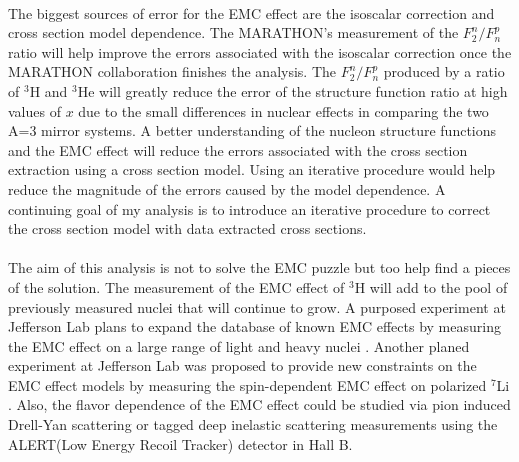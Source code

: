 \paragraph{}The biggest sources of error for the EMC effect are the isoscalar correction and cross section model dependence. The MARATHON's measurement of the $F^n_2/F^p_n$ ratio will help improve the errors associated with the isoscalar correction once the MARATHON collaboration finishes the analysis. The $F^n_2/F^p_n$ produced by a ratio of $^3$H and $^3$He will greatly reduce the error of the structure function ratio at high values of $x$ due to the small differences in nuclear effects in comparing the two A=3 mirror systems. A better understanding of the nucleon structure functions and the EMC effect will reduce the errors associated with the cross section extraction using a cross section model. Using an iterative procedure would help reduce the magnitude of the errors caused by the model dependence. A continuing goal of my analysis is to introduce an iterative procedure to correct the cross section model with data extracted cross sections. 

\paragraph{}The aim of this analysis is not to solve the EMC puzzle but too help find a pieces of the solution. The measurement of the EMC effect of $^3$H will add to the pool of previously measured nuclei that will continue to grow. A purposed experiment at Jefferson Lab plans to expand the database of known EMC effects by measuring the EMC effect on a large range of light and heavy nuclei \cite{pro_gaskell}. Another planed experiment at Jefferson Lab was proposed to provide new constraints on the EMC effect models by measuring the spin-dependent EMC effect on polarized $^7$Li \cite{pro_brooks}. Also, the flavor dependence of the EMC effect could be studied via pion induced Drell-Yan scattering\cite{Dutta} or tagged deep inelastic scattering measurements using the ALERT(Low Energy Recoil Tracker) detector in Hall B\cite{Armstrong}.


